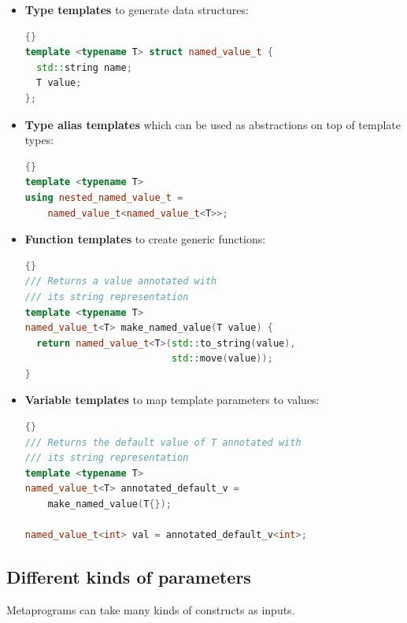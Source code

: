 \documentclass[../main]{subfiles}
\begin{document}
\begin{itemize}

  \item

\textbf{Type templates} to generate data structures:
\begin{lstlisting}[language=c++]{}
template <typename T> struct named_value_t {
  std::string name;
  T value;
};
\end{lstlisting}

  \item

\textbf{Type alias templates} which can be used as abstractions on top of
template types:
\begin{lstlisting}[language=c++]{}
template <typename T>
using nested_named_value_t =
    named_value_t<named_value_t<T>>;
\end{lstlisting}

  \item

\textbf{Function templates} to create generic functions:
\begin{lstlisting}[language=c++]{}
/// Returns a value annotated with
/// its string representation
template <typename T>
named_value_t<T> make_named_value(T value) {
  return named_value_t<T>(std::to_string(value),
                          std::move(value));
}
\end{lstlisting}

  \item

\textbf{Variable templates} to map template parameters to values:
\begin{lstlisting}[language=c++]{}
/// Returns the default value of T annotated with
/// its string representation
template <typename T>
named_value_t<T> annotated_default_v =
    make_named_value(T{});

named_value_t<int> val = annotated_default_v<int>;
\end{lstlisting}

\end{itemize}

\subsection{
  Different kinds of parameters
}

Metaprograms can take many kinds of \cpp constructs as inputs.
\end{document}
